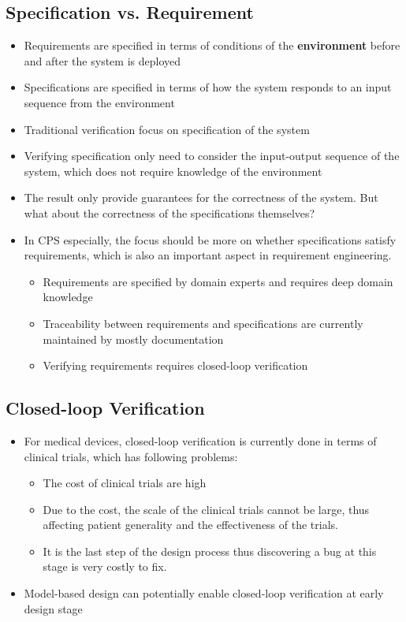 \documentclass{llncs}
\begin{document}
\subsection{Specification vs. Requirement}
\begin{itemize}
	\item Requirements are specified in terms of conditions of the \textbf{environment} before and after the system is deployed
    \item Specifications are specified in terms of how the system responds to an input sequence from the environment
    \item Traditional verification focus on specification of the system
    \item Verifying specification only need to consider the input-output sequence of the system, which does not require knowledge of the environment
    \item The result only provide guarantees for the correctness of the system. But what about the correctness of the specifications themselves?
   
    \item In CPS especially, the focus should be more on whether specifications satisfy requirements, which is also an important aspect in requirement engineering.
    
    \begin{itemize}
        
        \item Requirements are specified by domain experts and requires deep domain knowledge 
        \item Traceability between requirements and specifications are currently maintained by mostly documentation
        \item Verifying requirements requires closed-loop verification
    \end{itemize}
\end{itemize}
\subsection{Closed-loop Verification}
\begin{itemize}
    \item For medical devices, closed-loop verification is currently done in terms of clinical trials, which has following problems:
    \begin{itemize}
      \item The cost of clinical trials are high
      \item Due to the cost, the scale of the clinical trials cannot be large, thus affecting patient generality and the effectiveness of the trials.
      \item It is the last step of the design process thus discovering a bug at this stage is very costly to fix.
	\end{itemize}
	\item Model-based design can potentially enable closed-loop verification at early design stage
\end{itemize}
    
\end{document}
